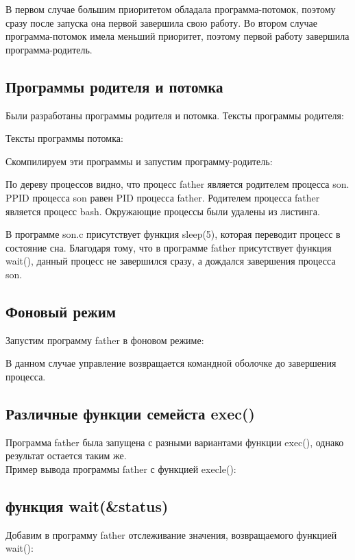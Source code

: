 \documentclass[a4paper]{article}
\begin{document}
	В первом случае большим приоритетом обладала программа-потомок, поэтому сразу после запуска она первой завершила свою работу. Во втором случае программа-потомок имела меньший приоритет, поэтому первой работу завершила программа-родитель.
	
\subsection{Программы родителя и потомка}
	Были разработаны программы родителя и потомка. Тексты программы родителя:
	

	Тексты программы потомка:
	
	
	Скомпилируем эти программы и запустим программу-родитель:
	
	
	По дереву процессов  видно, что процесс father является родителем процесса son. PPID процесса son равен PID процесса father. Родителем процесса father является процесс bash. Окружающие процессы были удалены из листинга.
	
	В программе son.c присутствует функция sleep(5), которая переводит процесс в состояние сна. Благодаря тому, что в программе father присутствует функция wait(), данный процесс не завершился сразу, а дождался завершения процесса son.
	
\subsection{Фоновый режим}
	Запустим программу father в фоновом режиме:
	
	В данном случае управление возвращается командной оболочке до завершения процесса.
	
\subsection{Различные функции семейста exec()}
	Программа father была запущена с разными вариантами функции exec(), однако результат остается таким же.\\
Пример вывода программы father с функцией execle():
	

\subsection{функция wait(\&status)}		
	Добавим в программу father отслеживание значения, возвращаемого функцией wait():
	
	
\end{document}
